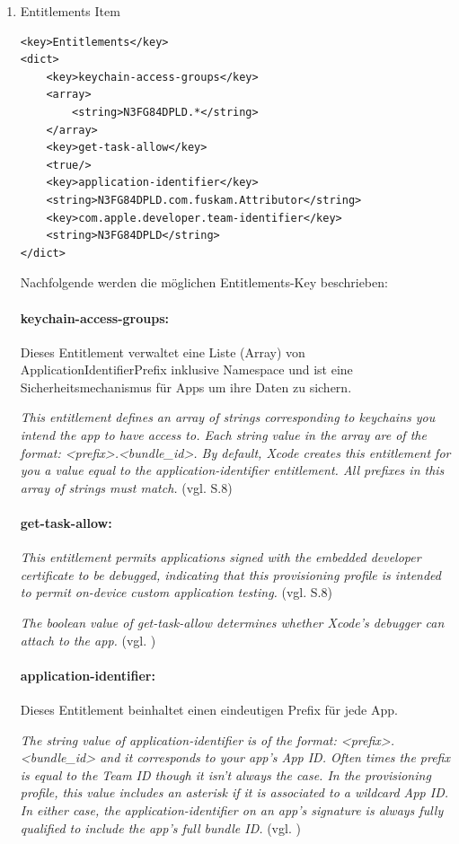 \begin{enumerate}
    \item Entitlements Item
\begin{lstlisting}[captionpos=b, caption={Entitlements Item}]
<key>Entitlements</key>
<dict>
    <key>keychain-access-groups</key>
    <array>
        <string>N3FG84DPLD.*</string>           
    </array>
    <key>get-task-allow</key>
    <true/>
    <key>application-identifier</key>
    <string>N3FG84DPLD.com.fuskam.Attributor</string>
    <key>com.apple.developer.team-identifier</key>
    <string>N3FG84DPLD</string>
</dict>
\end{lstlisting}

Nachfolgende werden die möglichen Entitlements-Key beschrieben:

\paragraph{keychain-access-groups:}
Dieses Entitlement verwaltet eine Liste (Array) von ApplicationIdentifierPrefix inklusive Namespace und ist eine Sicherheitsmechanismus für Apps um ihre Daten zu sichern. \par 
    \glqq \textit{This entitlement defines an array of strings corresponding to keychains you intend the app to have access to. Each string value in the array are of the format: <prefix>.<bundle\_id>. By default, Xcode creates this entitlement for you a value equal to the application-identifier entitlement. All prefixes in this array of strings must match.}\grqq{} (vgl. \cite{iOSSec[5]} S.8)

\paragraph{get-task-allow:} \glqq\textit{This entitlement permits applications signed with the embedded developer certificate to be debugged, indicating that this provisioning profile is intended to permit on-device custom application testing.}\grqq{} (vgl. \cite{iOSSec[5]} S.8) \par 
    \glqq \textit{The boolean value of get-task-allow determines whether Xcode's debugger can attach to the app.}\grqq{} (vgl. \cite{ProvisioningProfile[3]})

\paragraph{application-identifier:} Dieses Entitlement beinhaltet einen eindeutigen Prefix für jede App.\par
    \glqq \textit{The string value of application-identifier is of the format: <prefix>.<bundle\_id> and it corresponds to your app's App ID. Often times the prefix is equal to the Team ID though it isn't always the case. In the provisioning profile, this value includes an asterisk if it is associated to a wildcard App ID. In either case, the application-identifier on an app's signature is always fully qualified to include the app's full bundle ID.} \grqq{} (vgl. \cite{ProvisioningProfile[3]})


\end{enumerate}
